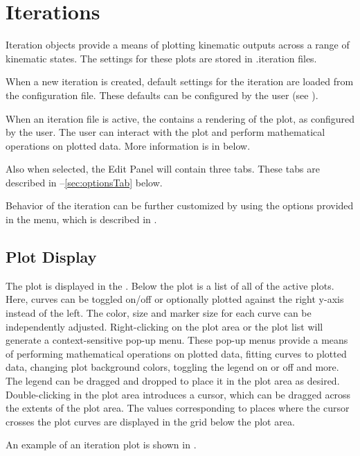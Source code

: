 \chapter{Iterations} \label{ch:iterations}

Iteration objects provide a means of plotting kinematic outputs across a range of kinematic states.  The settings for these plots are stored in .iteration files.

When a new iteration is created, default settings for the iteration are loaded from the configuration file.  These defaults can be configured by the user (see ).

When an iteration file is active, the  contains a rendering of the plot, as configured by the user.  The user can interact with the plot and perform mathematical operations on plotted data.  More information is in  below.

Also when selected, the Edit Panel will contain three tabs.  These tabs are described in --\ref{sec:optionsTab} below.

Behavior of the iteration can be further customized by using the options provided in the  menu, which is described in .

\section{Plot Display} \label{sec:plotDisplay}

The plot is displayed in the .  Below the plot is a list of all of the active plots.  Here, curves can be toggled on/off or optionally plotted against the right y-axis instead of the left.  The color, size and marker size for each curve can be independently adjusted.  Right-clicking on the plot area or the plot list will generate a context-sensitive pop-up menu.  These pop-up menus provide a means of performing mathematical operations on plotted data, fitting curves to plotted data, changing plot background colors, toggling the legend on or off and more.  The legend can be dragged and dropped to place it in the plot area as desired.  Double-clicking in the plot area introduces a cursor, which can be dragged across the extents of the plot area.  The values corresponding to places where the cursor crosses the plot curves are displayed in the grid below the plot area.

An example of an iteration plot is shown in .

